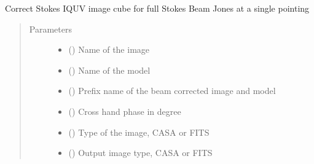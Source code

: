 \documentclass[letterpaper,10pt,english]{sphinxmanual}
\begin{document}
\begin{fulllineitems}
\begin{fulllineitems}
\label{\detokenize{paircars:paircars.fullpol_selfcal_LTS.PolSelfcal.correct_image_for_cross_phase}}
\sphinxAtStartPar
Correct Stokes IQUV image cube for full Stokes Beam Jones at a single pointing
\begin{quote}\begin{description}
\item[{Parameters}] \leavevmode\begin{itemize}
\item {} 
\sphinxAtStartPar
{} () \textendash{} Name of the image

\item {} 
\sphinxAtStartPar
{} () \textendash{} Name of the model

\item {} 
\sphinxAtStartPar
{} () \textendash{} Prefix name of the beam corrected image and model

\item {} 
\sphinxAtStartPar
{} () \textendash{} Cross hand phase in degree

\item {} 
\sphinxAtStartPar
{} () \textendash{} Type of the image, CASA or FITS

\item {} 
\sphinxAtStartPar
{} () \textendash{} Output image type, CASA or FITS


\end{itemize}
\end{description}
\end{quote}
\end{fulllineitems}
\end{fulllineitems}
\end{document}
